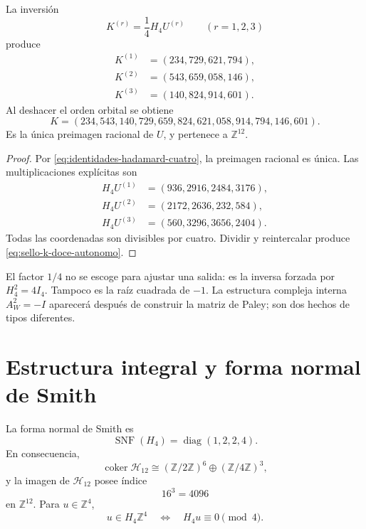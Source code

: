 \begin{theorem}
\label{thm:reconstruccion-entera-k-hadamard}
La inversión
\begin{equation}
 K^{(r)}=\frac14H_4U^{(r)}
 \qquad(r=1,2,3)
 \label{eq:inversion-bloques-hadamard}
\end{equation}
produce
\begin{align*}
 K^{(1)}&=(234,729,621,794),\\
 K^{(2)}&=(543,659,058,146),\\
 K^{(3)}&=(140,824,914,601).
\end{align*}
Al deshacer el orden orbital se obtiene
\begin{equation}
 \boxed{
 K=(234,543,140,729,659,824,621,058,914,794,146,601).}
 \label{eq:sello-k-doce-autonomo}
\end{equation}
Es la única preimagen racional de \(U\), y pertenece a
\(\mathbb Z^{12}\).
\end{theorem}

\begin{proof}
Por \eqref{eq:identidades-hadamard-cuatro}, la preimagen racional es única.
Las multiplicaciones explícitas son
\begin{align*}
 H_4U^{(1)}&=(936,2916,2484,3176),\\
 H_4U^{(2)}&=(2172,2636,232,584),\\
 H_4U^{(3)}&=(560,3296,3656,2404).
\end{align*}
Todas las coordenadas son divisibles por cuatro. Dividir y reintercalar
produce \eqref{eq:sello-k-doce-autonomo}.
\end{proof}

El factor \(1/4\) no se escoge para ajustar una salida: es la inversa
forzada por \(H_4^2=4I_4\). Tampoco es la raíz cuadrada de \(-1\). La
estructura compleja interna \(A_W^2=-I\) aparecerá después de construir la
matriz de Paley; son dos hechos de tipos diferentes.

\section{Estructura integral y forma normal de Smith}

\begin{theorem}
\label{thm:smith-hadamard-autonomo}
La forma normal de Smith es
\begin{equation}
 \operatorname{SNF}(H_4)=\operatorname{diag}(1,2,2,4).
 \label{eq:snf-hadamard-autonoma}
\end{equation}
En consecuencia,
\begin{equation}
 \operatorname{coker}\mathcal H_{12}
 \cong(\mathbb Z/2\mathbb Z)^6
 \oplus(\mathbb Z/4\mathbb Z)^3,
 \label{eq:cociente-hadamard-doce}
\end{equation}
y la imagen de \(\mathcal H_{12}\) posee índice
\[
 16^3=4096
\]
en \(\mathbb Z^{12}\). Para \(u\in\mathbb Z^4\),
\begin{equation}
 u\in H_4\mathbb Z^4
 \quad\Longleftrightarrow\quad
 H_4u\equiv0\pmod4.
 \label{eq:criterio-imagen-hadamard}
\end{equation}
\end{theorem}

